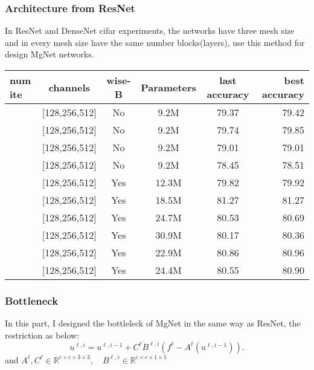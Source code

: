 \subsubsection{Architecture from ResNet}
In ResNet and DenseNet cifar experiments, the networks have three mesh size and in every mesh size have the same number blocks(layers), use this method for design MgNet networks.
\begin{table}[H]
	\begin{tabular}{| l | c | c | c | c | r |}
		\hline
		num ite       &      channels        &  wise-B     &    Parameters   &   last accuracy   &  best accuracy  \\
		\hline
		[2,2,2]        &   [128,256,512]      &  No         &    9.2M         &    79.37          &  79.42          \\
		\hline
		[4,4,4]        &   [128,256,512]      &  No         &    9.2M         &    79.74          &  79.85          \\
		\hline
		[6,6,6]        &   [128,256,512]      &  No         &    9.2M         &    79.01          &  79.01          \\
		\hline
		[8,8,8]        &   [128,256,512]      &  No         &    9.2M         &    78.45          &  78.51          \\
		\hline
		\hline
		[2,2,2]        &   [128,256,512]      &  Yes        &    12.3M        &    79.82          &  79.92          \\
		\hline
		[4,4,4]        &   [128,256,512]      &  Yes        &    18.5M        &    81.27          &  81.27          \\
		\hline
		[6,6,6]        &   [128,256,512]      &  Yes        &    24.7M        &    80.53          &  80.69          \\
		\hline
		[8,8,8]        &   [128,256,512]      &  Yes        &    30.9M        &    80.17          &  80.36          \\
		\hline
		\hline
		[10,10,4]      &   [128,256,512]      &  Yes        &    22.9M        &    80.86          &  80.96          \\
		\hline
		[12,12,4]      &   [128,256,512]      &  Yes        &    24.4M        &    80.55          &  80.90          \\
		\hline
	\end{tabular}
\end{table}

\subsubsection{Bottleneck}
In this part, I designed the bottleleck of MgNet in the same way as ResNet, the restriction as below:
\begin{equation}
u^{\ell,i} = u^{\ell,i-1} + C^{\ell}B^{\ell,i}  (f^\ell -  A^{\ell} (u^{\ell,i-1})).
\end{equation}
and $A^{\ell},C^{\ell}\in \mathbb{R}^{c\times c\times 3\times 3},\quad B^{\ell,i}\in \mathbb{R}^{c\times c\times 1\times 1}$


